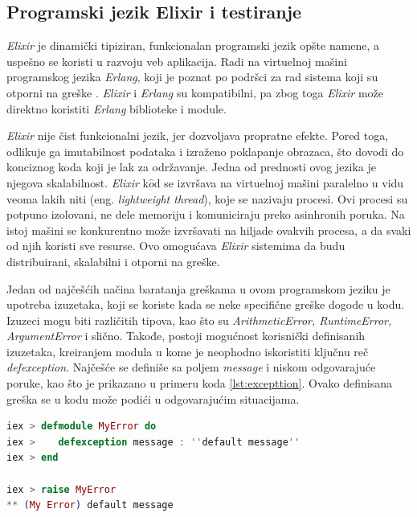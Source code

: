 \documentclass[12pt,oneside]{memoir}
\begin{document}
\subsection{Programski jezik Elixir i testiranje}
\par \emph{Elixir} je dinamički tipiziran, funkcionalan programski jezik opšte namene, a uspešno se koristi u razvoju veb aplikacija. Radi na virtuelnoj mašini programskog jezika \emph{Erlang}, koji je poznat po podršci za rad sistema koji su otporni na greške \cite{elixir-lang-official, erlang}. \emph{Elixir} i \emph{Erlang} su kompatibilni, pa zbog toga \emph{Elixir} može direktno koristiti \emph{Erlang} biblioteke i module. 
\par \emph{Elixir} nije čist funkcionalni jezik, jer dozvoljava propratne efekte. Pored toga, odlikuje ga imutabilnost podataka i izraženo poklapanje obrazaca, što dovodi do konciznog koda koji je lak za održavanje. Jedna od prednosti ovog jezika je njegova skalabilnost. \emph{Elixir} k$\hat{o}$d se izvršava na virtuelnoj mašini paralelno u vidu veoma lakih niti (eng. \emph{lightweight thread}), koje se nazivaju procesi. Ovi procesi su potpuno izolovani, ne dele memoriju i komuniciraju preko asinhronih poruka. Na istoj mašini se konkurentno može izvršavati na hiljade ovakvih procesa, a da svaki od njih koristi sve resurse. Ovo omogućava \emph{Elixir} sistemima da budu distribuirani, skalabilni i otporni na greške. 
\par Jedan od najčešćih načina baratanja greškama u ovom programskom jeziku je upotreba izuzetaka, koji se koriste kada se neke specifične greške dogode u kodu. Izuzeci mogu biti različitih tipova, kao što su \emph{ArithmeticError, RuntimeError, ArgumentError} i slično. Takođe, postoji mogućnost korisnički definisanih izuzetaka, kreiranjem modula u kome je neophodno iskoristiti ključnu reč \emph{defexception}. Najčešće se definiše sa poljem \emph{message} i niskom odgovarajuće poruke, kao što je prikazano u primeru koda \ref{lst:excepttion}. Ovako definisana greška se u kodu može podići u odgovarajućim situacijama. 


\begin{lstlisting}[language=elixir, caption={Definicija izuzetka u programskom jeziku Elixir},captionpos=b, label={lst:excepttion}]
iex > defmodule MyError do 
iex > 	 defexception message : ''default message''
iex > end 

iex > raise MyError
** (My Error) default message
\end{lstlisting}
\end{document}
